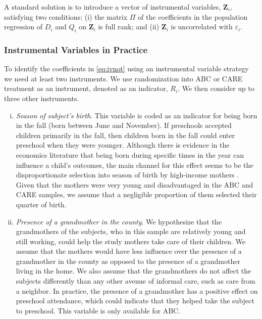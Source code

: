 \begin{appendices}
\noindent A standard solution is to introduce a vector of instrumental variables, $\mathbf{Z}_i$, satisfying two conditions: (i) the matrix $\Pi$ of the coefficients in the population regression of $D_i$ and $Q_i$ on $\mathbf{Z}_i$ is full rank; and (ii) $\mathbf{Z}_i$ is uncorrelated with $\varepsilon_i$.


\subsubsection{Instrumental Variables in Practice}

\noindent To identify the coefficients in \eqref{eq:ivnot} using an instrumental variable strategy we need at least two instruments. We use randomization into ABC or CARE treatment as an instrument, denoted as an indicator, $R_{i}$. We then consider up to three other instruments.

\begin{enumerate}[(i)]
\item \textit{Season of subject's birth}. This variable is coded as an indicator for being born in the fall (born between June and November). If preschools accepted children primarily in the fall, then children born in the fall could enter preschool when they were younger. Although there is evidence in the economics literature that being born during specific times in the year can influence a child's outcomes, the main channel for this effect seems to be the disproportionate selection into season of birth by high-income mothers \citep{Buckles-Hungerman_2013_RES}. Given that the mothers were very young and disadvantaged in the ABC and CARE samples, we assume that a negligible proportion of them selected their quarter of birth.

\item \textit{Presence of a grandmother in the county}. We hypothesize that the grandmothers of the subjects, who in this sample are relatively young and still working, could help the study mothers take care of their children. We assume that the mothers would have less influence over the presence of a grandmother in the county as opposed to the presence of a grandmother living in the home. We also assume that the grandmothers do not affect the subjects differently than any other avenue of informal care, such as care from a neighbor. In practice, the presence of a grandmother has a positive effect on preschool attendance, which could indicate that they helped take the subject to preschool. This variable is only available for ABC.


\end{enumerate}
\end{appendices}
